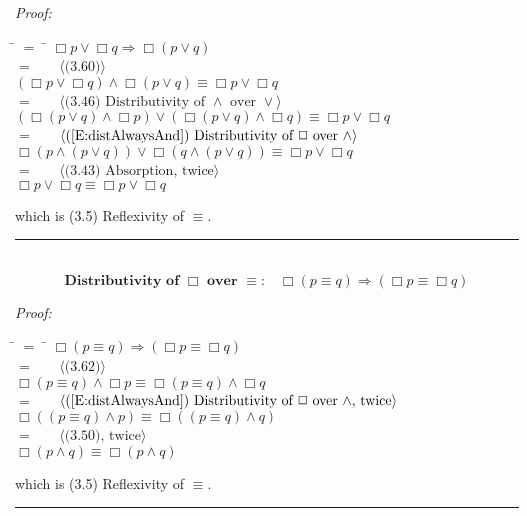 \documentclass[fleqn, leqno]{article}
\newcommand{\lgap}{2pt}                             %
\newcommand{\mymathindent}{24pt}                    %
\newcommand{\Always}{\Box}
\newcommand{\myqed}{\hfill\rule[-.23ex]{1.2ex}{2.0ex}}
\newcommand{\Gll} {\langle}                         %
\newcommand{\Ggg} {\rangle}                         %
\newcommand{\Hint}[1]     {\ \ \ $\Gll              \mbox{#1} \Ggg$ }   %
\begin{document}
\emph{Proof:}
\begin{tabbing}
\hspace{\mymathindent} \= $= \;$ \= \kill
  \> \>   $\Always p \lor \Always q \Rightarrow \Always(p \lor q)$\\[\lgap]
  \> $=$  \>  \Hint{(3.60)}\\[\lgap]
  \> \>   $(\Always p \lor \Always q) \land \Always(p \lor q) \equiv \Always p \lor \Always q$\\[\lgap]
  \> $=$  \>  \Hint{(3.46) Distributivity of $\land$ over $\lor$}\\[\lgap]
  \> \>   $(\Always (p \lor q) \land \Always p) \lor (\Always (p \lor q) \land \Always q) \equiv \Always p \lor \Always q$\\[\lgap]
  \> $=$  \>  \Hint{(\ref{E:distAlwaysAnd}) Distributivity of $\Always$ over $\land$}\\[\lgap]
  \> \>   $\Always(p \land (p \lor q)) \lor \Always(q \land (p \lor q)) \equiv \Always p \lor \Always q$\\[\lgap]
  \> $=$  \>  \Hint{(3.43) Absorption, twice}\\[\lgap]
  \> \>   $\Always p \lor \Always q \equiv \Always p \lor \Always q$\\[\lgap]
\end{tabbing}
which is (3.5) Reflexivity of $\equiv$. \myqed\\[\lgap]


\begin{equation}\label{E:distAlwaysEquiv}
\textbf{Distributivity of $\Always$ over $\equiv$:}\quad \Always (p \equiv q) \Rightarrow (\Always p \equiv \Always q)
\end{equation}

\emph{Proof:}
\begin{tabbing}
\hspace{\mymathindent} \= $= \;$ \= \kill
  \> \>   $\Always (p \equiv q) \Rightarrow (\Always p \equiv \Always q)$\\[\lgap]
  \> $=$  \>  \Hint{(3.62)}\\[\lgap]
  \> \>   $\Always (p \equiv q) \land \Always p \equiv \Always (p \equiv q) \land \Always q$\\[\lgap]
  \> $=$  \>  \Hint{(\ref{E:distAlwaysAnd}) Distributivity of $\Always$ over $\land$, twice}\\[\lgap]
  \> \>   $\Always((p \equiv q) \land p) \equiv \Always((p \equiv q) \land q)$\\[\lgap]
  \> $=$  \>  \Hint{(3.50), twice}\\[\lgap]
  \> \>   $\Always(p \land q) \equiv \Always (p \land q)$\\[\lgap]
\end{tabbing}
which is (3.5) Reflexivity of $\equiv$. \myqed\\[\lgap]
\end{document}
